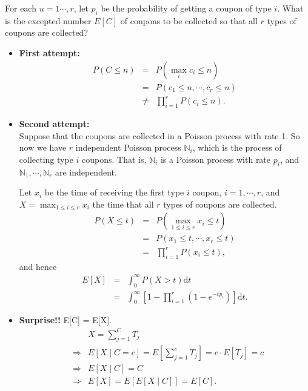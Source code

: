 \begin{example}
For each $ u = 1 \cdots, r $, let $ p_{i} $ be the probability of getting a coupon of type $ i $. What is the excepted number $ E[C] $ of conpons to be collected so that all $ r $ types of coupons are collected?

\begin{itemize}
\item \textbf{First attempt:}
\begin{eqnarray*}
P(C \le n)
  & = & P(\max_{i} c_{i} \le n) \\
  & = & P(c_{1} \le n, \cdots, c_{r} \le n) \\
  & \neq & \prod_{i = 1}^{r} P(c_{i} \le n).
\end{eqnarray*}

\item \textbf{Second attempt:} \\
Suppose that the coupons are collected in a Poisson process with rate 1. So now we have $ r $ independent Poisson process $ \mathbb{N}_{i} $, which is the process of collecting type $ i $ coupons. That is, $ \mathbb{N}_{i} $ is a Poisson process with rate $ p_{i} $, and $ \mathbb{N}_{1}, \cdots, \mathbb{N}_{r} $ are independent.

Let $ x_{i} $ be the time of receiving the first type $ i $ coupon, $ i = 1, \cdots, r $, and $ X = \max_{1 \le i \le r} x_{i} $ the time that all $ r $ types of coupons are collected.
\begin{eqnarray*}
P(X \le t)
  & = & P(\max_{1 \le i \le r} x_{i} \le t) \\
  & = & P(x_{1} \le t, \cdots, x_{r} \le t) \\
  & = & \prod_{i = 1}^{r} P(x_{i} \le t),
\end{eqnarray*}
and hence
\begin{eqnarray*}
E[X]
  & = & \int_{0}^{\infty} P(X > t) \mathrm{d}t \\
  & = & \int_{0}^{\infty} \left[ 1 - \prod_{i = 1}^{r} (1 - e^{-tp_{i}}) \right] \mathrm{d}t.
\end{eqnarray*}

\item \textbf{Surprise!!} E[C] = E[X].
\begin{eqnarray*}
  &   & X = \sum_{j = 1}^{C} T_{j} \\
  & \Rightarrow & E[X \mid C = c] = E \left[ \sum_{j = 1}^{c} T_{j} \right] = c \cdot E[T_{j}] = c \\
  & \Rightarrow & E[X \mid C] = C \\
  & \Rightarrow & E[X] = E[E[X \mid C]] = E[C].
\end{eqnarray*}
\end{itemize}
\end{example}

